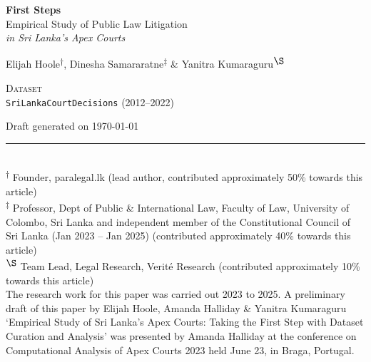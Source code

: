 \begin{titlepage}
\thispagestyle{empty}
\begin{center}
{\huge\bfseries First Steps\\[0.2cm]}
{\Large Empirical Study of Public Law Litigation\\[0.35cm]}
{\large\itshape in Sri Lanka's Apex Courts\\[1.2cm]}

{\large Elijah Hoole\textsuperscript{$\dagger$}, Dinesha Samararatne\textsuperscript{$\ddagger$} \& Yanitra Kumaraguru\textsuperscript{$\S$}\\[0.8cm]}

{\small\scshape Dataset}\\[0.25cm]
{\large\texttt{SriLankaCourtDecisions} (2012--2022)\\[1cm]}

{\small Draft generated on \today}
\end{center}
\vfill

\noindent\rule{\textwidth}{0.4pt}\\[0.3cm]
{\footnotesize
\textsuperscript{$\dagger$} Founder, paralegal.lk (lead author, contributed approximately 50\% towards this article)\\[0.15cm]
\textsuperscript{$\ddagger$} Professor, Dept of Public \& International Law, Faculty of Law, University of Colombo, Sri Lanka and independent member of the Constitutional Council of Sri Lanka (Jan 2023 -- Jan 2025) (contributed approximately 40\% towards this article)\\[0.15cm]
\textsuperscript{$\S$} Team Lead, Legal Research, Verité Research (contributed approximately 10\% towards this article)\\[0.3cm]
The research work for this paper was carried out 2023 to 2025. A preliminary draft of this paper by Elijah Hoole, Amanda Halliday \& Yanitra Kumaraguru `Empirical Study of Sri Lanka's Apex Courts: Taking the First Step with Dataset Curation and Analysis' was presented by Amanda Halliday at the conference on Computational Analysis of Apex Courts 2023 held June 23, in Braga, Portugal.
}
\end{titlepage}
